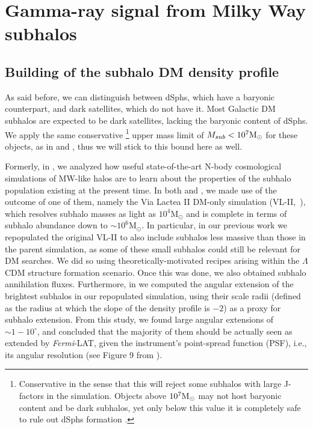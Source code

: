 \documentclass[%
 reprint,
nofootinbib,
 amsmath,amssymb,
 aps,
]{revtex4-2}
\begin{document}
\section{Gamma-ray signal from Milky Way subhalos}
\label{sec:DM_modeling}

\subsection{Building of the subhalo DM density profile}\label{sec:models}


As said before, we can distinguish between dSphs, which have a baryonic counterpart, and dark satellites, which do not have it. Most Galactic DM subhalos are expected to be dark satellites, lacking the baryonic content of dSphs. We apply the same conservative \footnote{Conservative in the sense that this will reject some subhalos with large J-factors in the simulation. Objects above $10^7 \rm M_{\odot}$ may not host baryonic content and be dark subhalos, yet only below this value it is completely safe to rule out dSphs formation \cite{Sawala_2015}.} upper mass limit of $M_{sub}<10^7 \rm M_{\odot}$ for these objects, as in  and , thus we will stick to this bound here as well.

Formerly, in , we analyzed how useful state-of-the-art N-body cosmological simulations of MW-like halos are to learn about the properties of the subhalo population existing at the present time. In both  and , we made use of the outcome of one of them, namely the Via Lactea II DM-only simulation  (VL-II,~\cite{Diemand2008}), which resolves subhalo masses as light as $10^4 \mathrm{M_\odot}$ and is complete in terms of subhalo abundance down to $\sim 10^6 \mathrm{M_\odot}$.
In particular, in our previous work we repopulated the original VL-II to also include  subhalos less massive than those in the parent simulation, as some of these small subhalos could still be relevant for DM searches. We did so using theoretically-motivated recipes arising within the $\Lambda$CDM structure formation scenario. Once this was done, we also obtained subhalo annihilation fluxes. 
Furthermore, in  we computed the angular extension of the brightest subhalos in our repopulated simulation, using their scale radii (defined as the radius at which the slope of the density profile is $-2$) as a proxy for subhalo extension. From this study, we found large angular extensions of $\sim1-10^\circ$, and concluded that the majority of them should be actually seen as extended by \textit{Fermi}-LAT, given the instrument's point-spread function (PSF), i.e., its angular resolution (see Figure 9 from ).
\end{document}
